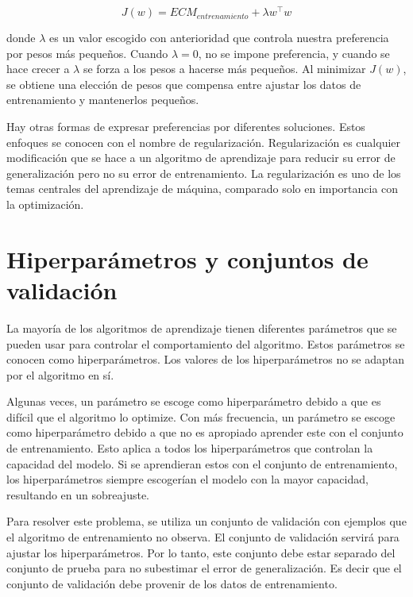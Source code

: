 $$ J(w) = ECM_{entrenamiento} + \lambda w^\intercal w$$

donde $\lambda$ es un valor escogido con anterioridad que controla nuestra preferencia por pesos más pequeños. Cuando $\lambda = 0$, no se impone preferencia, y cuando se hace crecer a $\lambda$ se forza a los pesos a hacerse más pequeños. Al minimizar $J(w)$, se obtiene una elección de pesos que compensa entre ajustar los datos de entrenamiento y mantenerlos pequeños.

\vspace{1em}

Hay otras formas de expresar preferencias por diferentes soluciones. Estos enfoques se conocen con el nombre de regularización. Regularización es cualquier modificación que se hace a un algoritmo de aprendizaje para reducir su error de generalización pero no su error de entrenamiento. La regularización es uno de los temas centrales del aprendizaje de máquina, comparado solo en importancia con la optimización. 
\cite{goodfellow-et-al-2016}

\section{Hiperparámetros y conjuntos de validación}
La mayoría de los algoritmos de aprendizaje tienen diferentes parámetros que se pueden usar para controlar el comportamiento del algoritmo. Estos parámetros se conocen como hiperparámetros. Los valores de los hiperparámetros no se adaptan por el algoritmo en sí. 

\vspace{1em}

Algunas veces, un parámetro se escoge como hiperparámetro debido a que es difícil que el algoritmo lo optimize. Con más frecuencia, un parámetro se escoge como hiperparámetro debido a que no es apropiado aprender este con el conjunto de entrenamiento. Esto aplica a todos los hiperparámetros que controlan la capacidad del modelo. Si se aprendieran estos con el conjunto de entrenamiento, los hiperparámetros siempre escogerían el modelo con la mayor capacidad, resultando en un sobreajuste.
\cite{goodfellow-et-al-2016}

\vspace{1em}

Para resolver este problema, se utiliza un conjunto de validación con ejemplos que el algoritmo de entrenamiento no observa. El conjunto de validación servirá para ajustar los hiperparámetros. Por lo tanto, este conjunto debe estar separado del conjunto de prueba para no subestimar el error de generalización. Es decir que el conjunto de validación debe provenir de los datos de entrenamiento.

